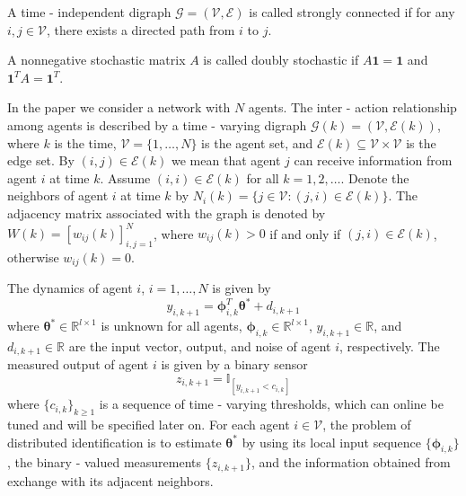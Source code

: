 \documentclass{beamer}
\begin{document}
	\begin{frame}
	 A time - independent digraph $\mathcal{G}=(\mathcal{V},\mathcal{E})$ is called strongly connected if for any $i,j\in\mathcal{V}$, there exists a directed path from $i$ to $j$.
	 
	 \vspace{0.2cm}
	 
	  A nonnegative stochastic matrix $A$ is called doubly stochastic if $A\mathbf{1}=\mathbf{1}$ and $\mathbf{1}^TA = \mathbf{1}^T$.

In the paper we consider a network with $N$ agents. The inter - action relationship among agents is described by a time - varying digraph $\mathcal{G}(k)=(\mathcal{V},\mathcal{E}(k))$, where $k$ is the time, $\mathcal{V}=\{1,\ldots,N\}$ is the agent set, and $\mathcal{E}(k)\subseteq\mathcal{V}\times\mathcal{V}$ is the edge set. By $(i,j)\in\mathcal{E}(k)$ we mean that agent $j$ can receive information from agent $i$ at time $k$. Assume $(i,i)\in\mathcal{E}(k)$ for all $k = 1,2,\ldots$. Denote the neighbors of agent $i$ at time $k$ by $N_i(k)=\{j\in\mathcal{V}:(j,i)\in\mathcal{E}(k)\}$. The adjacency matrix associated with the graph is denoted by $W(k)=[w_{ij}(k)]_{i,j = 1}^N$, where $w_{ij}(k)>0$ if and only if $(j,i)\in\mathcal{E}(k)$, otherwise $w_{ij}(k)=0$.

The dynamics of agent $i$, $i = 1,\ldots,N$ is given by
\[y_{i,k + 1}=\boldsymbol{\phi}_{i,k}^T\boldsymbol{\theta}^* + d_{i,k + 1}\tag{1}\]
where $\boldsymbol{\theta}^*\in\mathbb{R}^{l\times1}$ is unknown for all agents, $\boldsymbol{\phi}_{i,k}\in\mathbb{R}^{l\times1}$, $y_{i,k + 1}\in\mathbb{R}$, and $d_{i,k + 1}\in\mathbb{R}$ are the input vector, output, and noise of agent $i$, respectively. The measured output of agent $i$ is given by a binary sensor
\[z_{i,k + 1}=\mathbb{I}_{[y_{i,k + 1}<c_{i,k}]}\tag{2}\]
where $\{c_{i,k}\}_{k\geq1}$ is a sequence of time - varying thresholds, which can online be tuned and will be specified later on. For each agent $i\in\mathcal{V}$, the problem of distributed identification is to estimate $\boldsymbol{\theta}^*$ by using its local input sequence $\{\boldsymbol{\phi}_{i,k}\}$, the binary - valued measurements $\{z_{i,k + 1}\}$, and the information obtained from exchange with its adjacent neighbors.
	\end{frame}
	
\end{document}
